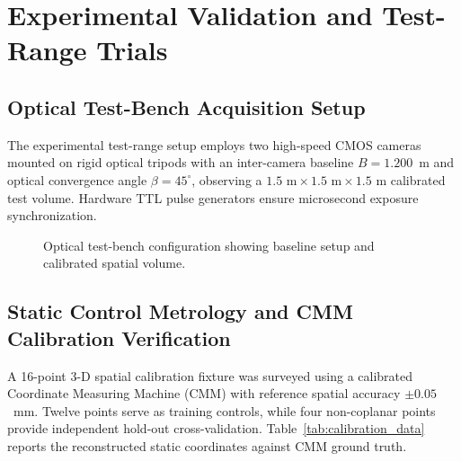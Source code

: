 \documentclass[a4paper,conference]{IEEEtran}
\begin{document}
\section{Experimental Validation and Test-Range Trials}

\subsection{Optical Test-Bench Acquisition Setup}
The experimental test-range setup employs two high-speed CMOS cameras mounted on rigid optical tripods with an inter-camera baseline $B = 1.200$~m and optical convergence angle $\beta = 45^\circ$, observing a $1.5\text{ m} \times 1.5\text{ m} \times 1.5\text{ m}$ calibrated test volume. Hardware TTL pulse generators ensure microsecond exposure synchronization.

\begin{figure}[t]
\centering
{}
\caption{Optical test-bench configuration showing baseline setup and calibrated spatial volume.}
\label{fig:setup}
\end{figure}

\subsection{Static Control Metrology and CMM Calibration Verification}
A 16-point 3-D spatial calibration fixture was surveyed using a calibrated Coordinate Measuring Machine (CMM) with reference spatial accuracy $\pm 0.05$~mm. Twelve points serve as training controls, while four non-coplanar points provide independent hold-out cross-validation. Table~\ref{tab:calibration_data} reports the reconstructed static coordinates against CMM ground truth.
\end{document}
